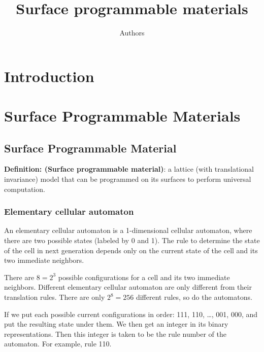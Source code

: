 \documentclass[twocolumn,superscriptaddress,english,showpacs,longbibliography]{revtex4-2}
\begin{document}
\title{Surface programmable materials}

\author{Authors}

\begin{abstract}
\end{abstract}

\maketitle

\section{Introduction}

\section{Surface Programmable Materials}\label{surface-programmable-materials}

\subsection{Surface Programmable
Material}\label{surface-programmable-material}

\textbf{Definition: (Surface programmable material)}: a lattice (with
translational invariance) model that can be programmed on its surfaces
to perform universal computation.

\subsubsection{Elementary cellular automaton}\label{elementary-cellular-automaton}

An elementary cellular automaton is a 1-dimensional cellular
automaton, where there are two possible states (labeled by 0 and 1). The rule to
determine the state of the cell in next generation depends only on the
current state of the cell and its two immediate neighbors.

There are $8 = 2^3$ possible configurations for a cell and its two
immediate neighbors. Different elementary cellular automaton are only
different from their translation rules. There are only $2^8 = 256$
different rules, so do the automatons.

If we put each possible current configurations in order: 111, 110,
\ldots, 001, 000, and put the resulting state under them. We then get an
integer in its binary representations. Then this integer is taken to be
the rule number of the automaton. For example, rule 110.
\end{document}
